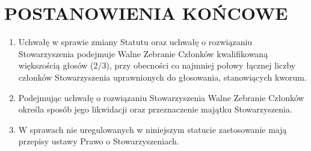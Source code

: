 \documentclass{article}
\begin{document}
\section{POSTANOWIENIA KOŃCOWE}
  \begin{enumerate}
    \item Uchwałę w sprawie zmiany Statutu oraz uchwałę o rozwiązaniu Stowarzyszenia podejmuje Walne Zebranie Członków kwalifikowaną większością głosów (2/3), przy obecności co najmniej połowy łącznej liczby członków Stowarzyszenia uprawnionych do głosowania, stanowiących kworum.
    \item Podejmując uchwałę o rozwiązaniu Stowarzyszenia Walne Zebranie Członków określa sposób jego likwidacji oraz przeznaczenie majątku Stowarzyszenia.
    \item W sprawach nie uregulowanych w niniejszym statucie zastosowanie mają przepisy ustawy Prawo o Stowarzyszeniach.
  \end{enumerate}
\end{document}
